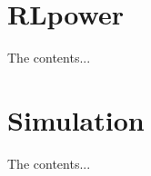 \documentclass[class=book, crop=false]{standalone}
\begin{document}
\section{RLpower}
The contents...

\section{Simulation}
The contents...
\end{document}
